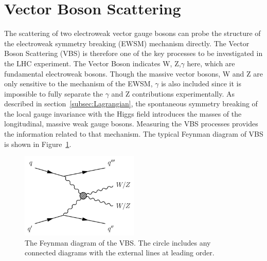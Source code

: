 \section{Vector Boson Scattering}
\label{sec:VBS}
The scattering of two electroweak vector gauge bosons can probe the structure of the electroweak symmetry breaking (EWSM) mechanism directly. 
The Vector Boson Scattering (VBS) is therefore one of the key processes to be investigated in the LHC experiment.
The Vector Boson indicates W, Z,$\gamma$ here, which are fundamental electroweak bosons. 
Though the massive vector bosons, W and Z are only sensitive to the mechanism of the EWSM, $\gamma$ is also included since it is impossible to fully separate the $\gamma$ and Z contributions experimentally. 
As described in section~\ref{subsec:Lagrangian}, the spontaneous symmetry breaking of the local gauge invariance with the Higgs field
introduces the masses of the longitudinal, massive weak gauge bosons. 
Measuring the VBS processes provides the information related to that mechanism.
The typical Feynman diagram of VBS is shown in Figure~\ref{fig:VBS}.

\begin{figure}[tbp]
\begin{center}
 \includegraphics[width=0.50\textwidth,keepaspectratio]{figures/VBS}
\caption{
The Feynman diagram of the VBS. The circle includes any connected diagrams with the external lines at leading order.%
}
\label{fig:VBS}
\end{center}
\end{figure}

